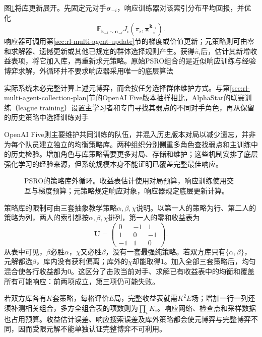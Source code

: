 图\ref{fig:rl-multi-agent-psro}将库更新展开。先固定元对手$\bm\sigma_{-i}$，响应训练器对该索引分布平均回报，并优化
\[
 \mathbb E_{\bm k_{-i}\sim\bm\sigma_{-i}}
       J_i(\pi_i,\bm\pi_{-i}^{\bm k_{-i}}).
\]
响应器可调用第\ref{sec:rl-multi-agent-update}节的梯度或价值更新；元策略则可由零和求解器、遗憾更新或其他已规定的群体选择规则产生。获得$\hat\pi_i$后，估计其新增收益表项，将它加入库，再重新求元策略。原始PSRO组合的是近似响应训练与经验博弈求解，外循环并不要求响应器采用唯一的底层算法

实际系统未必完整计算上述元博弈，而会按任务选择群体维护方式。与第\ref{sec:rl-multi-agent-collection-plan}节的OpenAI Five版本抽样相比，AlphaStar的联赛训练（league training）设置主学习者和专门寻找其弱点的不同对手角色，再从保留的历史策略中选择训练对手

OpenAI Five则主要维护共同训练的队伍，并混入历史版本对局以减少遗忘，并非为每个队员建立独立的均衡策略库。两种组织分别侧重多角色查找弱点和主训练中的历史检验。增加角色与库策略需要更多对局、存储和维护；这些机制安排了底层强化学习的经验来源，但系统规模本身不能证明已覆盖完整最佳响应。

\begin{figure}[htbp]
 \centering
 
 \caption{PSRO的策略库外循环。收益表估计使用对局预算，响应训练使用交互与梯度预算；元策略规定响应对象，响应器规定底层更新计算。}
 \label{fig:rl-multi-agent-psro}
\end{figure}

策略库的限制可由三套抽象教学策略$\alpha,\beta,\chi$说明。以第一人的策略为行、第二人的策略为列，两人的索引都按$\alpha,\beta,\chi$排列，第一人的零和收益表为
\[
 \bm U=
 \begin{pmatrix}0&-1&1\\1&0&-1\\-1&1&0\end{pmatrix}.
\]
从表中可见，$\beta$必胜$\alpha$，$\chi$又必胜$\beta$，没有一套最强纯策略。若双方库只有$\{\alpha,\beta\}$，元解都选$\beta$，库内没有获利偏离；库外的$\chi$却能取得1。加入全部三套策略后，均匀混合使各行收益都为0。这区分了击败当前对手、求解已有收益表中的均衡和覆盖所有可能响应：前两项成立，第三项仍可能失败。

若双方库各有$K$套策略，每格评价$E$局，完整收益表就需$K^2E$场；增加一行一列还须补测相关组合，多方全组合表的项数则为$\prod_iK_i$。响应网络、检查点和采样数据也占用预算。收益估计误差、响应搜索误差及库外策略都会使元博弈与完整博弈不同，因而受限元解不能单独认证完整博弈不可利用。

